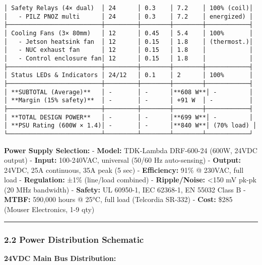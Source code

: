 \documentclass[
]{article}
\begin{document}
\begin{verbatim}
│ Safety Relays (4× dual)  │ 24      │ 0.3    │ 7.2    │ 100% (coil)│
│   - PILZ PNOZ multi      │ 24      │ 0.3    │ 7.2    │ energized) │
├──────────────────────────┼─────────┼────────┼────────┼────────────┤
│ Cooling Fans (3× 80mm)   │ 12      │ 0.45   │ 5.4    │ 100%       │
│   - Jetson heatsink fan  │ 12      │ 0.15   │ 1.8    │ (thermost.)│
│   - NUC exhaust fan      │ 12      │ 0.15   │ 1.8    │            │
│   - Control enclosure fan│ 12      │ 0.15   │ 1.8    │            │
├──────────────────────────┼─────────┼────────┼────────┼────────────┤
│ Status LEDs & Indicators │ 24/12   │ 0.1    │ 2      │ 100%       │
├──────────────────────────┼─────────┼────────┼────────┼────────────┤
│ **SUBTOTAL (Average)**   │ -       │ -      │**608 W**│ -         │
│ **Margin (15% safety)**  │ -       │ -      │ +91 W  │ -          │
├──────────────────────────┼─────────┼────────┼────────┼────────────┤
│ **TOTAL DESIGN POWER**   │ -       │ -      │**699 W**│ -         │
│ **PSU Rating (600W × 1.4)│ -       │ -      │**840 W**│ (70% load) │
└──────────────────────────┴─────────┴────────┴────────┴────────────┘
\end{verbatim}

\textbf{Power Supply Selection:} - \textbf{Model:} TDK-Lambda DRF-600-24
(600W, 24VDC output) - \textbf{Input:} 100-240VAC, universal (50/60 Hz
auto-sensing) - \textbf{Output:} 24VDC, 25A continuous, 35A peak (5 sec)
- \textbf{Efficiency:} 91\% @ 230VAC, full load - \textbf{Regulation:}
±1\% (line/load combined) - \textbf{Ripple/Noise:} \textless150 mV pk-pk
(20 MHz bandwidth) - \textbf{Safety:} UL 60950-1, IEC 62368-1, EN 55032
Class B - \textbf{MTBF:} 590,000 hours @ 25°C, full load (Telcordia
SR-332) - \textbf{Cost:} \$285 (Mouser Electronics, 1-9 qty)

\begin{center}\rule{0.5\linewidth}{0.5pt}\end{center}

\hypertarget{power-distribution-schematic}{%
\subsubsection{2.2 Power Distribution
Schematic}\label{power-distribution-schematic}}

\textbf{24VDC Main Bus Distribution:}
\end{document}
